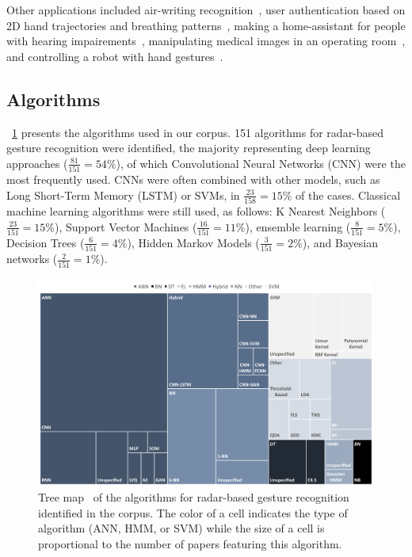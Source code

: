 Other applications included air-writing recognition~\cite{Wang:2020a}, user authentication based on 2D hand trajectories and breathing patterns~\cite{Leem:2020b}, making a home-assistant for people with hearing impairements~\cite{Santhalingam:2020b}, manipulating medical images in an operating room~\cite{Miller:2020}, and controlling a robot with hand gestures~\cite{Zhang:2020a,Li:2009}.

\subsection{Algorithms} \label{sec:state_of_the_art:radar:algorithms}

\fig~\ref{fig:state_of_the_art:radar:algorithms} presents the algorithms used in our corpus.
151 algorithms for radar-based gesture recognition were identified, the majority representing deep learning approaches ($\frac{81}{151}=54\%$), of which Convolutional Neural Networks (CNN) were the most frequently used.
CNNs were often combined with other models, such as Long Short-Term Memory (LSTM) or SVMs, in $\frac{23}{158}=15\%$ of the cases.
Classical machine learning algorithms were still used, as follows: K Nearest Neighbors ($\frac{23}{151}=15\%$), Support Vector Machines ($\frac{16}{151}=11\%$), ensemble learning ($\frac{8}{151}=5\%$), Decision Trees ($\frac{6}{151}=4\%$), Hidden Markov Models ($\frac{3}{151}=2\%$), and Bayesian networks ($\frac{2}{151}=1\%$). 

\begin{figure}[t]
    \centering
    \includegraphics[width=\linewidth]{Figures/StateOfTheArt/Radar/treemap-algorithms.pdf}
    \vspace{-10pt}
    \caption{Tree map~\cite{Shneiderman:1992} of the algorithms for radar-based gesture recognition identified in the corpus. The color of a cell indicates the type of algorithm (\eg ANN, HMM, or SVM) while the size of a cell is proportional to the number of papers featuring this algorithm.}
    \label{fig:state_of_the_art:radar:algorithms}
\end{figure}


